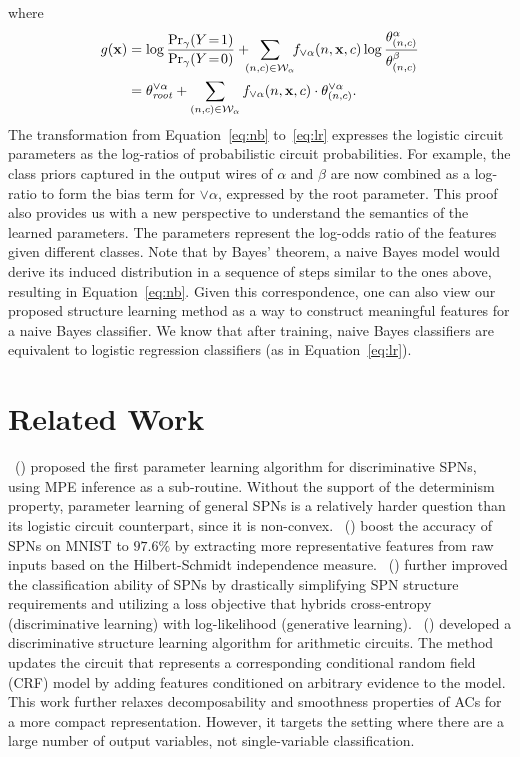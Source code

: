 \documentclass[letterpaper]{article} %
\newcommand{\sample}{{\bf x}}
\newcommand{\citet}[1]{\citeauthor{#1}~(\citeyear{#1})}
\begin{document}
where
\begin{align}
g(\sample)&= \log\frac{\Pr_\gamma(Y\!=\!1)}{\Pr_\gamma(Y\!=\!0)} + \!\!\!\sum_{(n,c) \in \mathcal{W}_{\alpha}} \!\!  f_{\lor \alpha}(n,\sample,c) \log \frac{\theta^\alpha_{(n,c)}}{\theta^\beta_{(n,c)}}  \label{eq:nb}\\
&=\theta^{\lor \alpha}_{\mathit{root}} + \sum_{(n,c) \in \mathcal{W}_{\alpha}}f_{\lor \alpha}(n,\sample,c) \cdot \theta_{(n,c)}^{\lor \alpha}. \label{eq:lr}
\end{align}  The transformation from Equation~\ref{eq:nb} to~\ref{eq:lr} expresses the logistic circuit parameters as the  log-ratios of probabilistic circuit probabilities.
For example, the class priors captured in the output wires of $\alpha$ and $\beta$ are now combined as a log-ratio to form the bias term for $\lor \alpha$, expressed by the root parameter.  This proof also provides us with a new perspective to understand the semantics of the learned parameters.
The parameters represent the log-odds ratio of the features given different classes. Note that by Bayes' theorem, a naive Bayes model would derive its induced distribution in a sequence of steps similar to the ones above, resulting in Equation~\ref{eq:nb}. Given this correspondence, one can also view our proposed structure learning method as a way to construct meaningful features for a naive Bayes classifier. We know that after training, naive Bayes classifiers are equivalent to logistic regression classifiers (as in Equation~\ref{eq:lr}).



\vspace{-3.22mm}
\section{Related Work}
\citet{gens2012discriminative} proposed the first parameter learning algorithm for discriminative SPNs, using MPE inference as a sub-routine. Without the support of the determinism property, parameter learning of general SPNs is a relatively harder question than its logistic circuit counterpart, since it is non-convex. \citet{adel2015learning} boost the accuracy of SPNs on MNIST to  $97.6\%$ by extracting more representative features from raw inputs based on the Hilbert-Schmidt independence measure.
\citet{rat-spn2018} further improved the  classification ability of SPNs by drastically simplifying SPN structure requirements and utilizing a loss objective that hybrids cross-entropy (discriminative learning) with log-likelihood (generative learning).  \citet{rooshenas2016discriminative} developed a discriminative structure learning algorithm for arithmetic circuits. The method updates the circuit that represents a corresponding conditional random field (CRF) model by adding features conditioned on arbitrary evidence to the model. This work further relaxes decomposability and smoothness properties of ACs for a more compact representation. However, it targets the setting where there are a large number of output variables, not single-variable classification.
\end{document}
